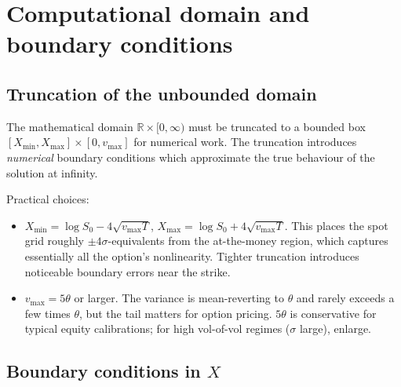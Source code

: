 \documentclass[11pt]{article}
\theoremstyle{plain}
\theoremstyle{definition}
\theoremstyle{remark}
\begin{document}
\section{Computational domain and boundary conditions}

\subsection{Truncation of the unbounded domain}

The mathematical domain $\mathbb{R} \times [0, \infty)$ must be truncated to a bounded box $[X_{\min}, X_{\max}] \times [0, v_{\max}]$ for numerical work. The truncation introduces \emph{numerical} boundary conditions which approximate the true behaviour of the solution at infinity.

Practical choices:
\begin{itemize}[topsep=2pt]
    \item $X_{\min} = \log S_0 - 4 \sqrt{v_{\max} T}$, $X_{\max} = \log S_0 + 4 \sqrt{v_{\max} T}$. This places the spot grid roughly $\pm 4 \sigma$-equivalents from the at-the-money region, which captures essentially all the option's nonlinearity. Tighter truncation introduces noticeable boundary errors near the strike.
    \item $v_{\max} = 5 \theta$ or larger. The variance is mean-reverting to $\theta$ and rarely exceeds a few times $\theta$, but the tail matters for option pricing. $5 \theta$ is conservative for typical equity calibrations; for high vol-of-vol regimes ($\sigma$ large), enlarge.
\end{itemize}

\subsection{Boundary conditions in $X$}
\end{document}
